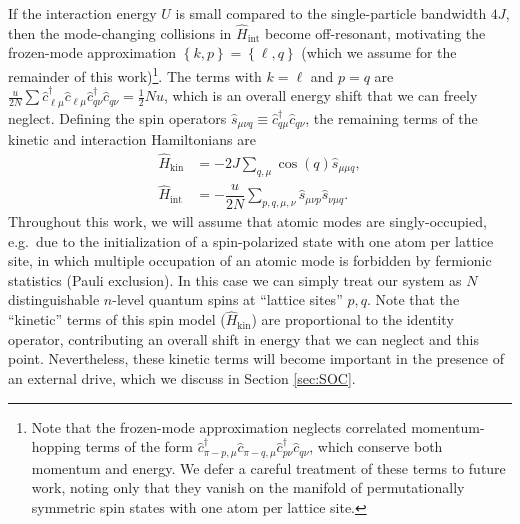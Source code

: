 \documentclass[aps,pra,nofootinbib,twocolumn,superscriptaddress]{revtex4-2}
\renewcommand{\t}{\text} %
\newcommand{\f}[2]{\dfrac{#1}{#2}} %
\newcommand{\p}[1]{\left(#1\right)} %
\renewcommand{\set}[1]{\left\{#1\right\}} %
\newcommand{\1}{\mathds{1}}
\renewcommand{\c}{\hat c}
\newcommand{\s}{\hat s}
\renewcommand{\H}{\hat H}
\begin{document}
If the interaction energy $U$ is small compared to the single-particle bandwidth $4J$, then the mode-changing collisions in $\H_{\t{int}}$ become off-resonant, motivating the frozen-mode approximation $\set{k,p}=\set{\ell,q}$ (which we assume for the remainder of this work)\footnote{Note that the frozen-mode approximation neglects correlated momentum-hopping terms of the form $\c_{\pi-p,\mu}^\dag \c_{\pi-q,\mu} \c_{p\nu}^\dag \c_{q\nu}$, which conserve both momentum and energy.
We defer a careful treatment of these terms to future work, noting only that they vanish on the manifold of permutationally symmetric spin states with one atom per lattice site.}.
The terms with $k=\ell$ and $p=q$ are $\frac{u}{2N} \sum \c_{\ell\mu}^\dag \c_{\ell\mu} \c_{q\nu}^\dag \c_{q\nu} = \frac12 N u$, which is an overall energy shift that we can freely neglect.
Defining the spin operators $\s_{\mu\nu q}\equiv \c_{q\mu}^\dag \c_{q\nu}$, the remaining terms of the kinetic and interaction Hamiltonians are
\begin{align}
  \H_{\t{kin}}
  &= -2J\sum_{q,\mu} \cos\p{q} \s_{\mu\mu q},
  \label{H_kin_start} \\
  \H_{\t{int}}
  &= -\f{u}{2N} \sum_{p,q,\mu,\nu} \s_{\mu\nu p} \s_{\nu\mu q}.
  \label{eq:H_int_start}
\end{align}
Throughout this work, we will assume that atomic modes are singly-occupied, e.g.~due to the initialization of a spin-polarized state with one atom per lattice site, in which multiple occupation of an atomic mode is forbidden by fermionic statistics (Pauli exclusion).
In this case we can simply treat our system as $N$ distinguishable $n$-level quantum spins at ``lattice sites'' $p,q$.
Note that the ``kinetic'' terms of this spin model ($\H_{\t{kin}}$) are proportional to the identity operator, contributing an overall shift in energy that we can neglect and this point.
Nevertheless, these kinetic terms will become important in the presence of an external drive, which we discuss in Section \ref{sec:SOC}.
\end{document}
